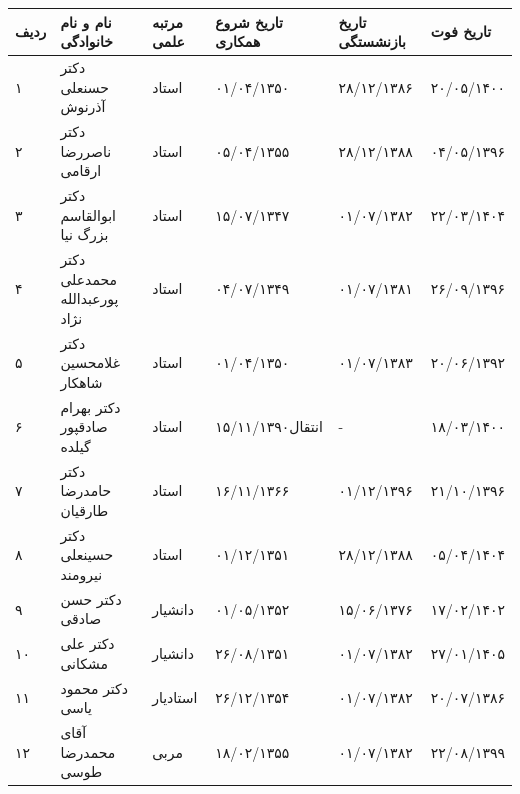 \documentclass[
  letterpaper,
  DIV=11,
  numbers=noendperiod]{scrreprt}
\newcounter{none} %
\begin{document}
{\def\LTcaptype{none} %
\begin{longtable}[]{@{}
  >{\raggedright\arraybackslash}p{}
  >{\raggedright\arraybackslash}p{}
  >{\raggedright\arraybackslash}p{}
  >{\raggedright\arraybackslash}p{}
  >{\raggedright\arraybackslash}p{}
  >{\raggedright\arraybackslash}p{}@{}}
\toprule\noalign{}
\begin{minipage}[b]{\linewidth}\raggedright
ردیف
\end{minipage} & \begin{minipage}[b]{\linewidth}\raggedright
نام و نام خانوادگی
\end{minipage} & \begin{minipage}[b]{\linewidth}\raggedright
مرتبه علمی
\end{minipage} & \begin{minipage}[b]{\linewidth}\raggedright
تاریخ شروع همکاری
\end{minipage} & \begin{minipage}[b]{\linewidth}\raggedright
تاریخ بازنشستگی
\end{minipage} & \begin{minipage}[b]{\linewidth}\raggedright
تاریخ فوت
\end{minipage} \\
\midrule\noalign{}
\endhead
\bottomrule\noalign{}
\endlastfoot
۱ & دکتر حسنعلی آذرنوش & استاد & ۰۱/۰۴/۱۳۵۰ & ۲۸/۱۲/۱۳۸۶ & ۲۰/۰۵/۱۴۰۰ \\
۲ & دکتر ناصررضا ارقامی & استاد & ۰۵/۰۴/۱۳۵۵ & ۲۸/۱۲/۱۳۸۸ &
۰۴/۰۵/۱۳۹۶ \\
۳ & دکتر ابوالقاسم بزرگ نیا & استاد & ۱۵/۰۷/۱۳۴۷ & ۰۱/۰۷/۱۳۸۲ &
۲۲/۰۳/۱۴۰۴ \\
۴ & دکتر محمدعلی پورعبدالله نژاد & استاد & ۰۴/۰۷/۱۳۴۹ & ۰۱/۰۷/۱۳۸۱ &
۲۶/۰۹/۱۳۹۶ \\
۵ & دکتر غلامحسین شاهکار & استاد & ۰۱/۰۴/۱۳۵۰ & ۰۱/۰۷/۱۳۸۳ &
۲۰/۰۶/۱۳۹۲ \\
۶ & دکتر بهرام صادقپور گیلده & استاد & انتقال۱۵/۱۱/۱۳۹۰ & - &
۱۸/۰۳/۱۴۰۰ \\
۷ & دکتر حامدرضا طارقیان & استاد & ۱۶/۱۱/۱۳۶۶ & ۰۱/۱۲/۱۳۹۶ &
۲۱/۱۰/۱۳۹۶ \\
۸ & دکتر حسینعلی نیرومند & استاد & ۰۱/۱۲/۱۳۵۱ & ۲۸/۱۲/۱۳۸۸ &
۰۵/۰۴/۱۴۰۴ \\
۹ & دکتر حسن صادقی & دانشیار & ۰۱/۰۵/۱۳۵۲ & ۱۵/۰۶/۱۳۷۶ & ۱۷/۰۲/۱۴۰۲ \\
۱۰ & دکتر علی مشکانی & دانشیار & ۲۶/۰۸/۱۳۵۱ & ۰۱/۰۷/۱۳۸۲ & ۲۷/۰۱/۱۴۰۵ \\
۱۱ & دکتر محمود یاسی & استادیار & ۲۶/۱۲/۱۳۵۴ & ۰۱/۰۷/۱۳۸۲ &
۲۰/۰۷/۱۳۸۶ \\
۱۲ & آقای محمدرضا طوسی & مربی & ۱۸/۰۲/۱۳۵۵ & ۰۱/۰۷/۱۳۸۲ & ۲۲/۰۸/۱۳۹۹ \\
\end{longtable}
}
\end{document}
